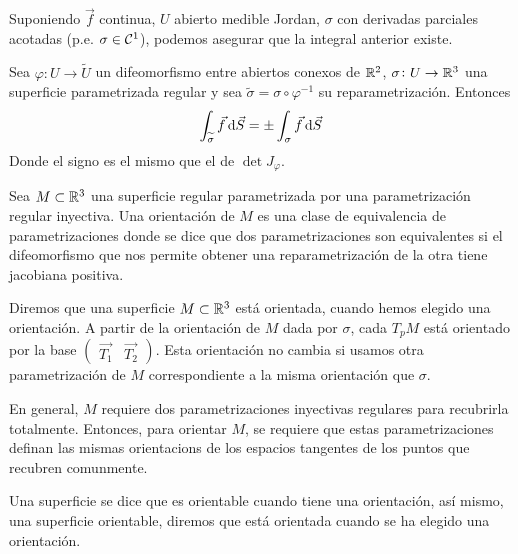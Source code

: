 \begin{obs*}
    Suponiendo $\vec{f}$ continua, $U$ abierto medible Jordan, $\sigma$ con derivadas parciales acotadas (p.e. $\sigma \in \mathcal{C}^1$),
    podemos asegurar que la integral anterior existe.
\end{obs*}

\begin{lema}
    Sea $\varphi \colon U \to \widetilde{U}$ un difeomorfismo entre abiertos conexos de $\mathbb{R}^2$, $\sigma \colon U \to \mathbb{R}^3$ una superficie
    parametrizada regular y sea $\widetilde{\sigma} = \sigma \circ \varphi^{-1}$ su reparametrización. Entonces
    \[
        \int_{\widetilde{\sigma}} \vec{f} \dif \vec{S} = \pm \int_\sigma \vec{f} \dif \vec{S}
    \]
    Donde el signo es el mismo que el de $\det J_\varphi$.
\end{lema}

\begin{defi}
    Sea $M \subset \mathbb{R}^3$ una superficie regular parametrizada por una parametrización regular inyectiva. Una orientación de $M$ es una
    clase de equivalencia de parametrizaciones donde se dice que dos parametrizaciones son equivalentes si el difeomorfismo que nos permite
    obtener una reparametrización de la otra tiene jacobiana positiva.
\end{defi}

\begin{defi}
    Diremos que una superficie $M \subset \mathbb{R}^3$ está orientada, cuando hemos elegido una orientación. A partir de la orientación de $M$ dada
    por $\sigma$, cada $T_pM$ está orientado por la base $\begin{pmatrix} \vec{T_1} & \vec{T_2} \end{pmatrix}$. Esta orientación no cambia si
    usamos otra parametrización de $M$ correspondiente a la misma orientación que $\sigma$.
\end{defi}

\begin{obs}
    En general, $M$ requiere dos parametrizaciones inyectivas regulares para recubrirla totalmente. Entonces, para orientar $M$, se requiere que
    estas parametrizaciones definan las mismas orientacions de los espacios tangentes de los puntos que recubren comunmente.
\end{obs}

\begin{defi}
    Una superficie se dice que es orientable cuando tiene una orientación, así mismo, una superficie orientable, diremos que está
    orientada cuando se ha elegido una orientación.
\end{defi}

